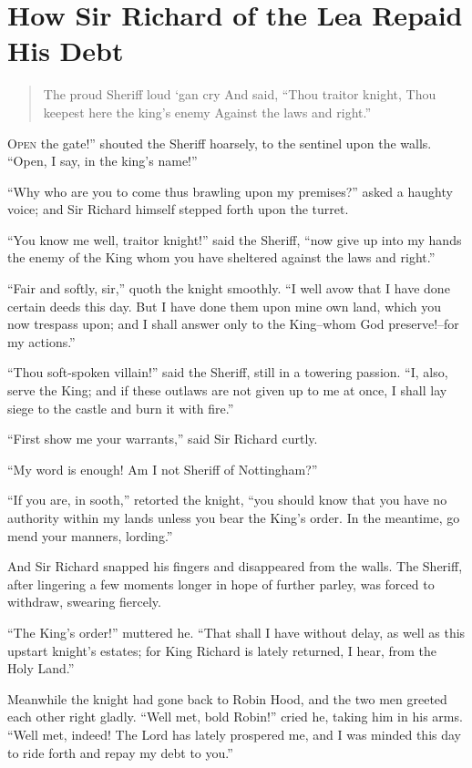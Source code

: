 \chapter{How Sir Richard of the Lea Repaid His Debt}

\begin{quote}
The proud Sheriff loud ‘gan cry
And said, “Thou traitor knight,
Thou keepest here the king’s enemy
Against the laws and right.”
\end{quote}

\lettrine{O}{pen} the gate!'' shouted the Sheriff hoarsely, to the sentinel upon
the walls. ``Open, I say, in the king's name!''

``Why who are you to come thus brawling upon my premises?'' asked a
haughty voice; and Sir Richard himself stepped forth upon the turret.

``You know me well, traitor knight!'' said the Sheriff, ``now give up
into my hands the enemy of the King whom you have sheltered against the
laws and right.''

``Fair and softly, sir,'' quoth the knight smoothly. ``I well avow that
I have done certain deeds this day. But I have done them upon mine own
land, which you now trespass upon; and I shall answer only to the
King--whom God preserve!--for my actions.''

``Thou soft-spoken villain!'' said the Sheriff, still in a towering
passion. ``I, also, serve the King; and if these outlaws are not given
up to me at once, I shall lay siege to the castle and burn it with
fire.''

``First show me your warrants,'' said Sir Richard curtly.

``My word is enough! Am I not Sheriff of Nottingham?''

``If you are, in sooth,'' retorted the knight, ``you should know that
you have no authority within my lands unless you bear the King's order.
In the meantime, go mend your manners, lording.''

And Sir Richard snapped his fingers and disappeared from the walls. The
Sheriff, after lingering a few moments longer in hope of further parley,
was forced to withdraw, swearing fiercely.

``The King's order!'' muttered he. ``That shall I have without delay, as
well as this upstart knight's estates; for King Richard is lately
returned, I hear, from the Holy Land.''

Meanwhile the knight had gone back to Robin Hood, and the two men
greeted each other right gladly. ``Well met, bold Robin!'' cried he,
taking him in his arms. ``Well met, indeed! The Lord has lately
prospered me, and I was minded this day to ride forth and repay my debt
to you.''

